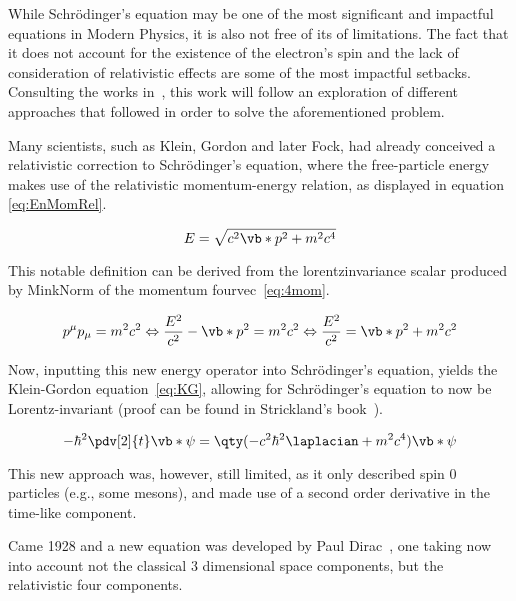 While Schrödinger's equation may be one of the most significant and impactful equations in Modern Physics, it is also not free of its of limitations. The fact that it does not account for the existence of the electron's spin and the lack of consideration of relativistic effects are some of the most impactful setbacks. Consulting the works in~\cite{Thaller1992,Beyer2016,Sakurai2020,Bethe1977}, this work will follow an exploration of different approaches that followed in order to solve the aforementioned problem.






Many scientists, such as Klein, Gordon and later Fock, had already conceived a relativistic correction to Schrödinger's equation, where the free-particle energy makes use of the relativistic momentum-energy relation,  as displayed in equation \eqref{eq:EnMomRel}.


 \begin{equation}
    E=\sqrt{c^2\vb*{p}^2+m^2c^4}
    \label{eq:EnMomRel}
 \end{equation}


 This notable definition can be derived from the \gls{lorentzinvariance} scalar produced by \gls{MinkNorm} of the momentum \gls{fourvec}~\eqref{eq:4mom}.


 \begin{equation}
    p^\mu p_\mu = m^2c^2\Leftrightarrow\dfrac{E^2}{c^2}-\vb*{p}^2=m^2c^2 \Leftrightarrow  \dfrac{E^2}{c^2}= \vb*{p}^2 +m^2c^2
    \label{eq:4mom}
\end{equation}

 Now, inputting this new energy operator into Schrödinger's equation, yields the Klein-Gordon equation~\eqref{eq:KG}, allowing for Schrödinger's equation to now be Lorentz-invariant (proof can be found in Strickland's book~\cite{Strickland}).

 \begin{equation}
    -\hbar^2 \pdv[2]{t} \vb*{\psi}=\qty(-c^2\hbar^2\laplacian + m^2c^4)\vb*{\psi}
    \label{eq:KG}
\end{equation}



 This new approach was, however, still limited, as it only described spin 0 particles (e.g., some mesons), and made use of a second order derivative in the time-like component.

Came 1928 and a new equation was developed by Paul Dirac~\cite{Dirac}, one taking now into account not the classical 3 dimensional space components, but the relativistic four components.




